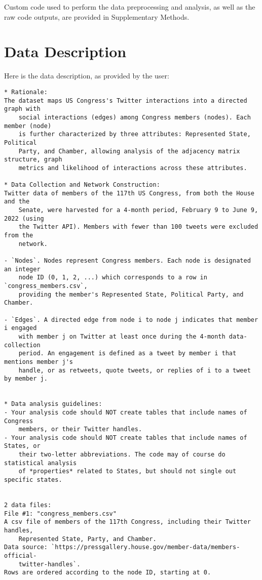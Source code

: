 \documentclass[11pt]{article}
\begin{document}
Custom code used to perform the data preprocessing and analysis, as well as the raw code outputs, are provided in Supplementary Methods.


\clearpage
\appendix

\section{Data Description} \label{sec:data_description} Here is the data description, as provided by the user:

\begin{Verbatim}[tabsize=4]
* Rationale:
The dataset maps US Congress's Twitter interactions into a directed graph with
	social interactions (edges) among Congress members (nodes). Each member (node)
	is further characterized by three attributes: Represented State, Political
	Party, and Chamber, allowing analysis of the adjacency matrix structure, graph
	metrics and likelihood of interactions across these attributes.

* Data Collection and Network Construction:
Twitter data of members of the 117th US Congress, from both the House and the
	Senate, were harvested for a 4-month period, February 9 to June 9, 2022 (using
	the Twitter API). Members with fewer than 100 tweets were excluded from the
	network.

- `Nodes`. Nodes represent Congress members. Each node is designated an integer
	node ID (0, 1, 2, ...) which corresponds to a row in `congress_members.csv`,
	providing the member's Represented State, Political Party, and Chamber.

- `Edges`. A directed edge from node i to node j indicates that member i engaged
	with member j on Twitter at least once during the 4-month data-collection
	period. An engagement is defined as a tweet by member i that mentions member j's
	handle, or as retweets, quote tweets, or replies of i to a tweet by member j.


* Data analysis guidelines:
- Your analysis code should NOT create tables that include names of Congress
	members, or their Twitter handles.
- Your analysis code should NOT create tables that include names of States, or
	their two-letter abbreviations. The code may of course do statistical analysis
	of *properties* related to States, but should not single out specific states.


2 data files:
File #1: "congress_members.csv"
A csv file of members of the 117th Congress, including their Twitter handles,
	Represented State, Party, and Chamber.
Data source: `https://pressgallery.house.gov/member-data/members-official-
	twitter-handles`.
Rows are ordered according to the node ID, starting at 0.


\end{Verbatim}
\end{document}
